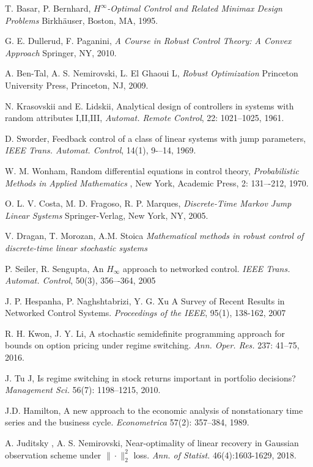 \documentclass[letterpaper,11pt]{article}
\begin{document}
\begin{thebibliography}{1}
T. Basar, P. Bernhard,
{\it $H^{\infty}$-Optimal Control and Related Minimax Design Problems}   
Birkh{\"a}user, Boston, MA, 1995.

G. E. Dullerud, F. Paganini,
{\it A Course in Robust Control Theory: A Convex Approach}
Springer, NY, 2010.

A. Ben-Tal, A. S. Nemirovski, L. El Ghaoui L, 
{\it Robust Optimization} 
Princeton University Press, Princeton, NJ, 2009.

N. Krasovskii and E. Lidskii, 
Analytical design of controllers in systems with random attributes I,II,III, 
{\it Automat. Remote Control}, 22: 1021–1025, 1961.

 D. Sworder, 
Feedback control of a class of linear systems with jump parameters, 
{\it IEEE Trans. Automat. Control}, 14(1), 9-–14, 1969.

W. M. Wonham, 
Random differential equations in control theory, 
{\it Probabilistic Methods in Applied Mathematics },  
New York, Academic Press, 2: 131–-212, 1970. 

O. L. V. Costa, M. D. Fragoso, R. P. Marques, 
{\it Discrete-Time Markov Jump Linear Systems }   
Springer-Verlag, New York, NY, 2005.

V. Dragan, T. Morozan, A.M. Stoica
{\it Mathematical methods in robust control of discrete-time linear stochastic systems } 

P. Seiler,  R. Sengupta,  
An $H_{\infty}$ approach to networked control.
{\it IEEE Trans. Automat. Control}, 50(3), 356–-364, 2005

J. P. Hespanha, P. Naghshtabrizi, Y. G. Xu
A Survey of Recent Results in Networked Control Systems.
{\it Proceedings of the IEEE}, 95(1), 138-162, 2007

R. H. Kwon,  J. Y. Li,
A stochastic semidefinite programming approach for bounds on option pricing under regime switching.
{\it Ann. Oper. Res.} 237: 41--75, 2016.

J. Tu J,
Is regime switching in stock returns important in portfolio decisions?
{\it Management Sci.} 56(7): 1198--1215, 2010.

J.D. Hamilton, 
A new approach to the economic analysis of nonstationary time
series and the business cycle. 
{\it Econometrica} 57(2): 357--384, 1989.

A. Juditsky , A. S. Nemirovski,   
Near-optimality of linear recovery in Gaussian
observation scheme under $\| \cdot \|_2^2 $ loss.
{\it Ann. of Statist.} 46(4):1603-1629, 2018.


\end{thebibliography}
\end{document}
